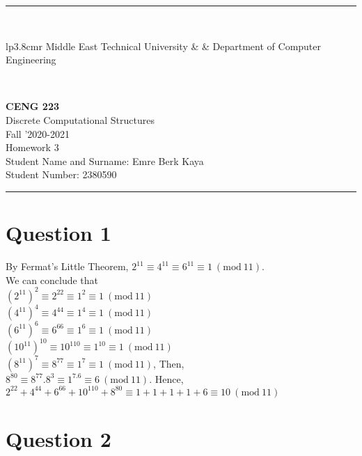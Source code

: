 \documentclass[12pt]{article}
\newcommand{\HRule}{\rule{\linewidth}{1mm}}
\newcommand{\Mod}[1]{\ (\mathrm{mod}\ #1)}
\begin{document}
\noindent 
\HRule \\[3mm]
\small
\begin{tabular}[b]{lp{3.8cm}r}
{} Middle East Technical University &  &
{} Department of Computer Engineering \\
\end{tabular} \\
\begin{center}

                 \LARGE \textbf{CENG 223} \\[4mm]
                 \Large Discrete Computational Structures \\[4mm]
                \normalsize Fall '2020-2021 \\
                    \Large Homework 3 \\
                \normalsize Student Name and Surname: Emre Berk Kaya \\
                \normalsize Student Number: 2380590 \\
\end{center}
\HRule

\doublespacing

\section*{Question 1}

    By Fermat's Little Theorem, $2^{11} \equiv 4^{11} \equiv 6^{11} \equiv 1 \Mod{11}$. \\
    We can conclude that\\
    $(2^{11})^{2} \equiv 2^{22} \equiv 1^2 \equiv 1 \Mod{11}$\\
    $(4^{11})^4 \equiv 4^{44} \equiv 1^4 \equiv 1 \Mod{11}$\\
    $(6^{11})^6 \equiv 6^{66} \equiv 1^6 \equiv 1 \Mod{11}$\\
    $(10^{11})^10 \equiv 10^{110} \equiv 1^{10} \equiv 1 \Mod{11}$\\
    $(8^{11})^7 \equiv 8^{77} \equiv 1^7 \equiv 1 \Mod{11}$, Then, \\
    $8^{80} \equiv 8^{77}.8^3 \equiv 1^7.6 \equiv 6 \Mod{11}$. Hence,\\
    $2^{22} + 4^{44} + 6^{66} + 10^{110} + 8^{80} \equiv 1+1+1+1+6 \equiv 10 \Mod{11}$
    
    

\section*{Question 2}
    
\end{document}
